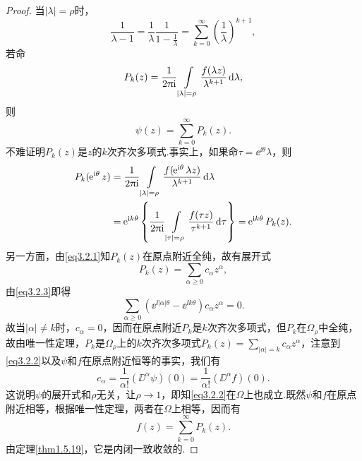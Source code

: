 \begin{proof}
	当$|\lambda|=\rho$时，
	\[\frac1{\lambda-1}=\frac1\lambda \frac{1}{1-\frac1\lambda}=\sum_{k=0}^{\infty}\left(\frac1\lambda\right)^{k+1},\]
	若命
	\begin{equation}\label{eq3.2.1}
		P_k(z)=\frac1{2\uppi\mathrm i}\int\limits_{|\lambda|=\rho}\frac{f(\lambda z)}{\lambda^{k+1}}\mathop{}\!\mathrm{d}\lambda,
	\end{equation}
则
\begin{equation}\label{eq3.2.2}
	\psi(z)=\sum_{k=0}^{\infty}P_k(z).
\end{equation}
不难证明$P_k(z)$是$z$的$k$次齐次多项式.事实上，如果命$\tau=\ee^{\ii\theta}\lambda$，则
\begin{align}\label{eq3.2.3}
	P_k(\ee^{\ii\theta}z)
	&=\frac1{2\pi\ii}\int\limits_{|\lambda|=\rho}\frac{f(\ee^{\ii\theta}\lambda z)}{\lambda^{k+1}}\dif\lambda\notag\\
	&=\ee^{\ii k\theta}\left\{\frac1{2\pi\ii}\int\limits_{|\tau|=\rho}\frac{f(\tau z)}{\tau^{k+1}}\dif\tau\right\}=\ee^{\ii k\theta}P_k(z).
\end{align}
另一方面，由\eqref{eq3.2.1}知$P_k(z)$在原点附近全纯，故有展开式
\[P_k(z)=\sum_{\alpha\ge0}c_\alpha z^\alpha,\]
由\eqref{eq3.2.3}即得
\[\sum_{\alpha\ge0}(\ee^{\ii|\alpha|\theta}-\ee^{\ii k\theta})c_\alpha z^\alpha=0.\]
故当$|\alpha|\neq k$时，$c_\alpha=0$，因而在原点附近$P_k$是$k$次齐次多项式，但$P_k$在$\Omega_\rho$中全纯，故由唯一性定理，$P_k$是$\Omega_\rho$上的$k$次齐次多项式$P_k(z)=\sum\limits_{|\alpha|=k}c_\alpha z^\alpha$，注意到\eqref{eq3.2.2}以及$\psi$和$f$在原点附近恒等的事实，我们有
\[c_\alpha=\frac1{\alpha!}(\DD^\alpha \psi)(0)=\frac1{\alpha!}(\DD^\alpha f)(0).\]
这说明$\psi$的展开式和$\rho$无关，让$\rho\to1$，即知\eqref{eq3.2.2}在$\Omega$上也成立.既然$\psi$和$f$在原点附近相等，根据唯一性定理，两者在$\Omega$上相等，因而有
\[f(z)=\sum_{k=0}^{\infty} P_k(z).\]
由定理\ref{thm1.5.19}，它是内闭一致收敛的.
\end{proof}
